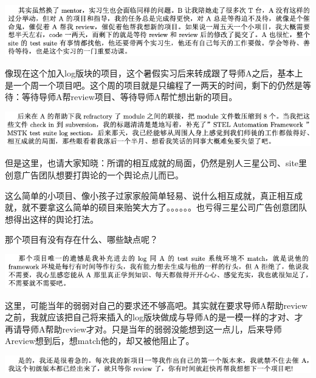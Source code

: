 \documentclass[9pt, b5paper]{article}
\begin{document}
\begin{center}
\includegraphics[width=.9\linewidth]{./pic/backups_plans_20210512_203909.png}
\end{center}

像现在这个加入log版块的项目，这个暑假实习后来转成跟了导师A之后，基本上是一个周一个项目吧。这个周的项目就是只编程了一两天的时间，剩下的仍然是等待：等待导师A帮review项目、等待导师A帮忙想出新的项目。 

\begin{center}
\includegraphics[width=.9\linewidth]{./pic/backups_plans_20210512_204219.png}
\end{center}

但是这里，也请大家知晓：所谓的相互成就的局面，仍然是别人三星公司、site里创意广告团队想要打舆论的一个舆论点儿而已。

这么简单的小项目、像小孩子过家家般简单轻易、说什么相互成就，真正相互成就，就不要拿这么简单的硕目来贻笑大方了。。。。。。也亏得三星公司广告创意团队想得出这样的舆论打法。 

那个项目有没有存在什么、哪些缺点呢？

\begin{center}
\includegraphics[width=.9\linewidth]{./pic/backups_plans_20210512_204634.png}
\end{center}

这里，可能当年的弱弱对自己的要求还不够高吧。其实就在要求导师A帮助review之前，我就应该把自己将来插入的log版块做成与导师A的是一模一样的才对、才再请导师A帮助review才对。只是当年的弱弱没能想到这一点儿，后来导师Areview想到后，想match他的，却又被他阻止了。

\begin{center}
\includegraphics[width=.9\linewidth]{./pic/backups_plans_20210512_210504.png}
\end{center}
\end{document}
